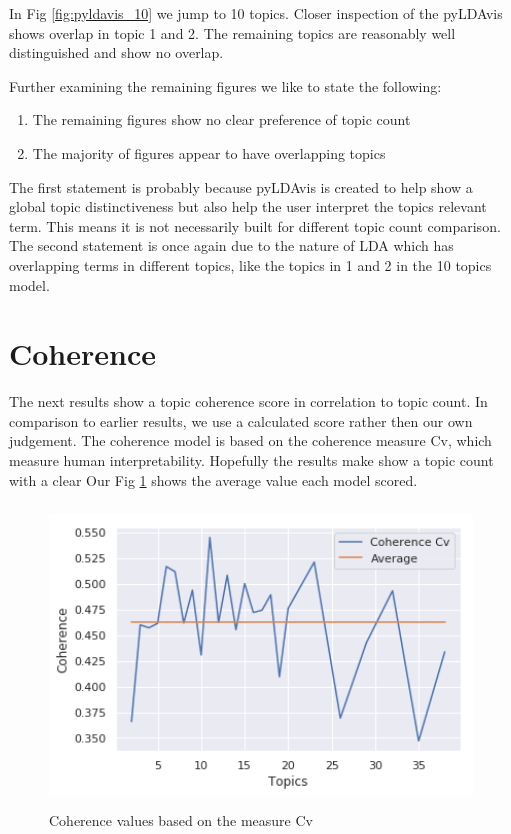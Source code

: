 In Fig \ref{fig:pyldavis_10} we jump to 10 topics. Closer inspection of the pyLDAvis shows overlap in topic 1 and 2. The remaining topics are reasonably well distinguished and show no overlap. 

Further examining the remaining figures we like to state the following:
\begin{enumerate}
  \item The remaining figures show no clear preference of topic count
  \item The majority of figures appear to have overlapping topics
\end{enumerate}
The first statement is probably because pyLDAvis is created to help show a global topic distinctiveness but also help the user interpret the topics relevant term. This means it is not necessarily built for different topic count comparison. The second statement is once again due to the nature of LDA which has overlapping terms in different topics, like the topics in 1 and 2 in the 10 topics model.

\FloatBarrier
\section{Coherence}\label{results:coherence}
The next results show a topic coherence score in correlation to topic count. In comparison to earlier results, we use a calculated score rather then our own judgement. The coherence model is based on the coherence measure Cv, which measure human interpretability. Hopefully the results make show a topic count with a clear  Our Fig \ref{fig:coherence} shows the average value each model scored. 

 \begin{figure}[h]
    \centering
    \includegraphics[width=15cm, height=8cm]{figures/coherence_values_topics.png}
    \caption{Coherence values based on the measure Cv}
    \label{fig:coherence}
\end{figure}


